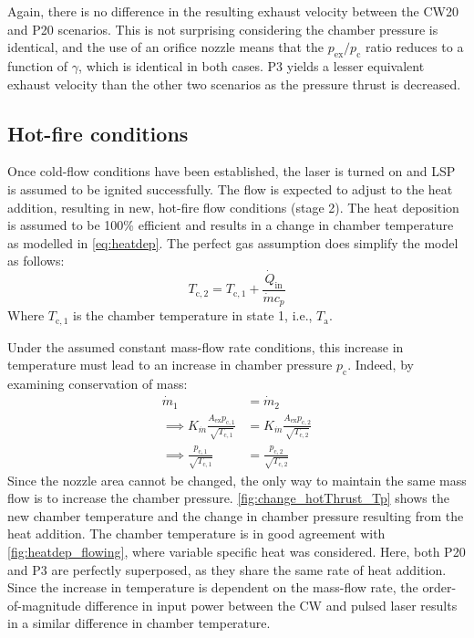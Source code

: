             Again, there is no difference in the resulting exhaust velocity between the CW20 and P20 scenarios. This is not surprising considering the chamber pressure is identical, and the use of an orifice nozzle means that the $p_\mathrm{ex}/p_\mathrm{c}$ ratio reduces to a function of $\gamma$, which is identical in both cases. P3 yields a lesser equivalent exhaust velocity than the other two scenarios as the pressure thrust is decreased.

        \subsection{Hot-fire conditions}
            Once cold-flow conditions have been established, the laser is turned on and LSP is assumed to be ignited successfully. The flow is expected to adjust to the heat addition, resulting in new, hot-fire flow conditions (stage 2). The heat deposition is assumed to be 100\% efficient and results in a change in chamber temperature as modelled in \autoref{eq:heatdep}. The perfect gas assumption does simplify the model as follows:
            \begin{equation}
                T_\mathrm{c,2} = T_\mathrm{c,1} + \frac{\dot{Q}_\mathrm{in}}{\dot{m}c_p}
            \end{equation}
            Where $T_\mathrm{c,1}$ is the chamber temperature in state 1, i.e., $T_\mathrm{a}$.

            Under the assumed constant mass-flow rate conditions, this increase in temperature must lead to an increase in chamber pressure $p_\mathrm{c}$. Indeed, by examining conservation of mass:
            \begin{align*}
                \dot{m}_1 &= \dot{m}_2 \\
                \implies K_{\dot{m}}\frac{A_\mathrm{ex}p_\mathrm{c,1}}{\sqrt{T_\mathrm{c,1}}} &= K_{\dot{m}}\frac{A_\mathrm{ex}p_\mathrm{c,2}}{\sqrt{T_\mathrm{c,2}}} \\
                \implies \frac{p_\mathrm{c,1}}{\sqrt{T_\mathrm{c,1}}} &= \frac{p_\mathrm{c,2}}{\sqrt{T_\mathrm{c,2}}}
            \end{align*}
            Since the nozzle area cannot be changed, the only way to maintain the same mass flow is to increase the chamber pressure. \autoref{fig:change_hotThrust_Tp} shows the new chamber temperature and the change in chamber pressure resulting from the heat addition. The chamber temperature is in good agreement with \autoref{fig:heatdep_flowing}, where variable specific heat was considered. Here, both P20 and P3 are perfectly superposed, as they share the same rate of heat addition. Since the increase in temperature is dependent on the mass-flow rate, the order-of-magnitude difference in input power between the CW and pulsed laser results in a similar difference in chamber temperature.

